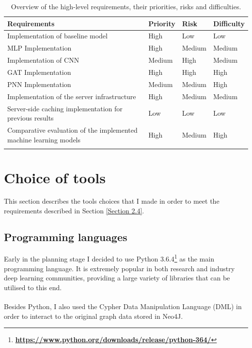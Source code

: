 	\begin{longtable}{|p{}|p{} p{} p{}|}
		\textbf{Requirements} & \textbf{Priority} & \textbf{Risk} & \textbf{Difficulty} \\
		\hline
		Implementation of baseline model & High & Low & Low \\
		MLP Implementation & High & Medium & Medium \\
		Implementation of CNN & Medium & High & Medium \\
		GAT Implementation & High & High & High \\
		PNN Implementation & Medium & Medium & High \\
		Implementation of the server infrastructure & High & Medium & Medium \\
		Server-side caching implementation for previous results & Low & Low & Low \\
		Comparative evaluation of the implemented machine learning models & High & Medium & High \\
		\hline
		\caption[Requirements overview]{\centering Overview of the high-level requirements, their priorities, risks and difficulties.}
		\label{Table 2.2}
	\end{longtable}

	\section{Choice of tools} \label{Section 2.5}
	This section describes the tools choices that I made in order to meet the requirements described in Section \ref{Section 2.4}. 
	\subsection{Programming languages} \label{Section 2.5.1}
	Early in the planning stage I decided to use Python 3.6.4\footnote{\textbf{\url{https://www.python.org/downloads/release/python-364/}}} as the main programming language. It is extremely popular in both research and industry deep learning communities, providing a large variety of libraries that can be utilised to this end. 
	\\ \\
	Besides Python, I also used the Cypher Data Manipulation Language (DML) in order to interact to the original graph data stored in Neo4J.  
	
